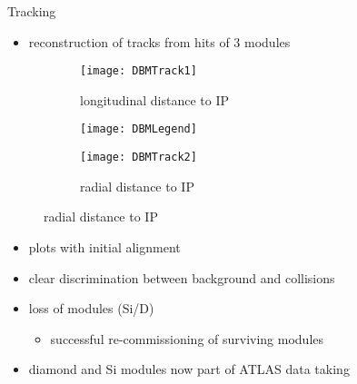% 
% 
\begin{frame}{Tracking}

	\begin{itemize}
		\itemfill
		\item reconstruction of tracks from hits of 3 modules
	\end{itemize}

	\vspace*{-5pt}
	\begin{figure}[h] 
		\centering
		\begin{subfigure}{0.4\textwidth}  
			\centering
			\texttt{[image: DBMTrack1]}
			\caption{longitudinal distance to IP}
		\end{subfigure}
		\begin{subfigure}{0.18\textwidth} 
			\centering
			\texttt{[image: DBMLegend]}
		\end{subfigure} 
		\begin{subfigure}{0.4\textwidth} 
			\centering
			\texttt{[image: DBMTrack2]}
			\caption{radial distance to IP} 	
		\end{subfigure}
	\end{figure}
	\vspace*{-10pt}

	\begin{itemize}
		\itemfill
		\item plots with initial alignment
		\item clear discrimination between background and collisions
		\item loss of modules (Si/D)
			\begin{itemize}
				\item successful re-commissioning of surviving modules
			\end{itemize}
		\item diamond and Si modules now part of ATLAS data taking
	\end{itemize}

\end{frame}